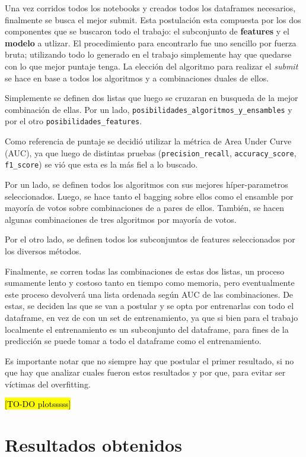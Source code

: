 \documentclass[a4paper]{article}
\begin{document}
Una vez corridos todos los notebooks y creados todos los dataframes necesarios, finalmente se busca el mejor submit. Esta postulación esta compuesta por los dos componentes que se buscaron todo el trabajo: el subconjunto de \textbf{features} y el \textbf{modelo} a utlizar. El procedimiento para encontrarlo fue uno sencillo por fuerza bruta; utilizando todo lo generado en el trabajo simplemente hay que quedarse con lo que mejor puntaje tenga. La elección del algoritmo para realizar el \textit{submit} se hace en base a todos los algoritmos y a combinaciones duales de ellos.

Simplemente se definen dos listas que luego se cruzaran en busqueda de la mejor combinación de ellas. Por un lado, \texttt{posibilidades\_algoritmos\_y\_ensambles} y por el otro \texttt{posibilidades\_features}.

Como referencia de puntaje se decidió utilizar la métrica de Area Under Curve (AUC), ya que luego de distintas pruebas (\texttt{precision\_recall}, \texttt{accuracy\_score}, \texttt{f1\_score}) se vió que esta es la más fiel a lo buscado.

Por un lado, se definen todos los algoritmos con sus mejores híper-parametros seleccionados. Luego, se hace tanto el bagging sobre ellos como el ensamble por mayoría de votos sobre combinaciones de a pares de ellos. También, se hacen algunas combinaciones de tres algoritmos por mayoría de votos.

Por el otro lado, se definen todos los subconjuntos de features seleccionados por los diversos métodos.

Finalmente, se corren todas las combinaciones de estas dos listas, un proceso sumamente lento y costoso tanto en tiempo como memoria, pero eventualmente este proceso devolverá una lista ordenada según AUC de las combinaciones. De estas, se deciden las que se van a postular y se opta por entrenarlas con todo el dataframe, en vez de con un set de entrenamiento, ya que si bien para el trabajo localmente el entrenamiento es un subconjunto del dataframe, para fines de la predicción se puede tomar a todo el dataframe como el entrenamiento.

Es importante notar que no siempre hay que postular el primer resultado, si no que hay que analizar cuales fueron estos resultados y por que, para evitar ser víctimas del overfitting. 

\hl{[TO-DO plotsssss]}

\section{Resultados obtenidos}
\end{document}
